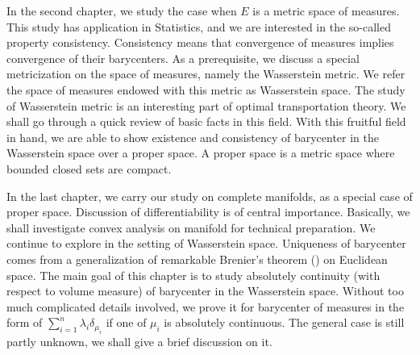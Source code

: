 In the second chapter, we study the case when $E$ is a metric space of measures.
This study has application in Statistics, and we are interested in the so-called property consistency.
Consistency means that convergence of measures implies convergence of their barycenters.
As a prerequisite, we discuss a special metricization on the space of measures,
namely the Wasserstein metric.
We refer the space of measures endowed with this metric as Wasserstein space.
The study of Wasserstein metric is an interesting part of optimal transportation theory.
We shall go through a quick review of basic facts in this field.
With this fruitful field in hand,
we are able to show existence and consistency of barycenter in the Wasserstein space over a proper space.
A proper space is a metric space where bounded closed sets are compact.

In the last chapter, we carry our study on complete manifolds,
as a special case of proper space.
Discussion of differentiability is of central importance.
Basically, we shall investigate convex analysis on manifold for technical preparation.
We continue to explore in the setting of Wasserstein space.
Uniqueness of barycenter comes from a generalization of
remarkable Brenier's theorem (\cite[Theorem 2.12]{villani2003topics}) on Euclidean space.
The main goal of this chapter is to study absolutely continuity (with respect to volume measure) of barycenter in the Wasserstein space.
Without too much complicated details involved, we prove it for barycenter of measures in the form of
$\sum_{i=1}^{n} \lambda_i \delta_{\mu_i}$ if one of $\mu_i$ is absolutely continuous.
The general case is still partly unknown, we shall give a brief discussion on it.
